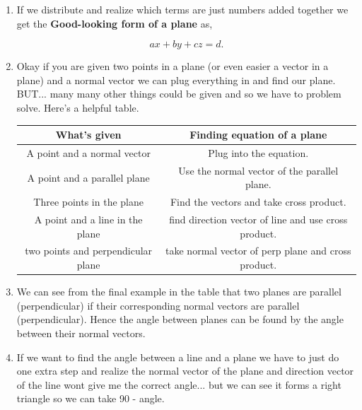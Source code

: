\documentclass[11pt]{article}
\begin{document}
\begin{enumerate}
\begin{equation*}
    a(x-x_0)+b(y-y_0)+c(z-z_0) = 0.
\end{equation*}

\item If we distribute and realize which terms are just numbers added together we get the \textbf{Good-looking form of a plane} as,

\begin{equation*}
    ax+by+cz = d.
\end{equation*}

\item Okay if you are given two points in a plane (or even easier a vector in a plane) and a normal vector we can plug everything in and find our plane. BUT... many many other things could be given and so we have to problem solve. Here's a helpful table.

\begin{center}

\begin{tabular}{|c|c|}
\hline
 \textbf{What's given}    & \textbf{Finding equation of a plane} \\
     \hline \hline
A point and a normal vector    &  Plug into the equation. \\
\hline
A point and a parallel plane & Use the normal vector of the parallel plane. \\
\hline
Three points in the plane & Find the vectors and take cross product. \\
\hline
A point and a line in the plane & find direction vector of line and use cross product. \\
\hline
two points and perpendicular plane & take normal vector of perp plane and cross product. \\
\hline
\end{tabular}

\end{center}


\item  We can see from the final example in the table that two planes are parallel (perpendicular) if their corresponding normal vectors are parallel (perpendicular). Hence the angle between planes can be found by the angle between their normal vectors.

\item If we want to find the angle between a line and a plane we have to just do one extra step and realize the normal vector of the plane and direction vector of the line wont give me the correct angle... but we can see it forms a right triangle so we can take 90 - angle.


\end{enumerate}
\end{document}
